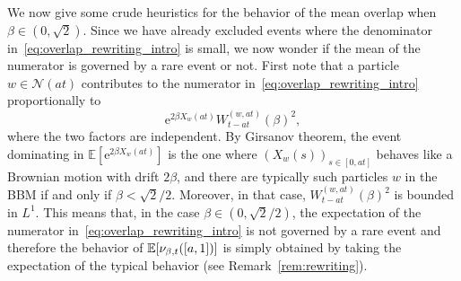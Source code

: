 \documentclass[AHL,Unicode,longabstracts,published]{cedram}
\newcommand{\e}{\mathrm{e}}
\newcommand{\E}{\mathbb{E}}
\newcommand\1{\mathds{1}}
\newcommand{\cN}{\mathcal{N}}
\newcommand{\Expec}[1]{\mathbb{E}\left[#1\right]}
\let\originalleft\left
\let\originalright\right
\renewcommand{\left}{\mathopen{}\mathclose\bgroup\originalleft}
\renewcommand{\right}{\aftergroup\egroup\originalright}
\begin{document}
We now give some crude heuristics for the behavior of the mean overlap when $\beta \in (0,\sqrt{2})$. Since we have already excluded events where the denominator in~\eqref{eq:overlap_rewriting_intro} is small, we now wonder if the mean of the numerator is governed by a rare event or not. First note that a particle $w \in \cN(at)$ contributes to the numerator in~\eqref{eq:overlap_rewriting_intro} proportionally to
\begin{equation}\label{eq:contrib_w}
\e^{2\beta X_w(at)} W_{t-at}^{(w,at)}(\beta)^2,
\end{equation}
where the two factors are independent. By Girsanov theorem, the event dominating in $\E[\e^{2\beta X_w(at)}]$ is the one where $(X_w(s))_{s\in[0,at]}$ behaves like a Brownian motion with drift $2\beta$, and there are typically such particles $w$ in the BBM if and only if $\beta < \sqrt{2}/2$. Moreover, in that case, $W_{t-at}^{(w,at)}(\beta)^2$ is bounded in $L^1$. This means that, in the case $\beta \in (0,\sqrt{2}/2)$, the expectation of the numerator in~\eqref{eq:overlap_rewriting_intro} is not governed by a rare event and therefore the behavior of $\Expec{\nu_{\beta, t}([a, 1])}$ is simply obtained by taking the expectation of the typical behavior (see Remark~\ref{rem:rewriting}).
\end{document}
